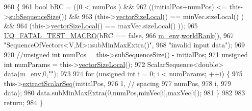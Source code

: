 \begin{DoxyCode}
960 \{
961   \textcolor{keywordtype}{bool} bRC = ((0                       <  numPos                 ) &&
962               ((initialPos+numPos)     <= this->\hyperlink{class_q_u_e_s_o_1_1_sequence_of_vectors_a0224bd3e961d86af5d2886301c0c2b86}{subSequenceSize}()) &&
963               (this->\hyperlink{class_q_u_e_s_o_1_1_base_vector_sequence_a2fefedf9e5b90f22881103b3f92555f6}{vectorSizeLocal}() == minVec.sizeLocal()     ) &&
964               (this->\hyperlink{class_q_u_e_s_o_1_1_base_vector_sequence_a2fefedf9e5b90f22881103b3f92555f6}{vectorSizeLocal}() == maxVec.sizeLocal()     ));
965   \hyperlink{_defines_8h_a56d63d18d0a6d45757de47fcc06f574d}{UQ\_FATAL\_TEST\_MACRO}(bRC == \textcolor{keyword}{false},
966                       \hyperlink{class_q_u_e_s_o_1_1_base_vector_sequence_a8e8824d2a63c5a43bcc6473e3a0491e8}{m\_env}.\hyperlink{class_q_u_e_s_o_1_1_base_environment_a78b57112bbd0e6dd0e8afec00b40ffa7}{worldRank}(),
967                       \textcolor{stringliteral}{"SequenceOfVectors<V,M>::subMinMaxExtra()"},
968                       \textcolor{stringliteral}{"invalid input data"});
969 
970   \textcolor{comment}{//unsigned int numPos = this->subSequenceSize() - initialPos;}
971   \textcolor{keywordtype}{unsigned} \textcolor{keywordtype}{int} numParams = this->\hyperlink{class_q_u_e_s_o_1_1_base_vector_sequence_a2fefedf9e5b90f22881103b3f92555f6}{vectorSizeLocal}();
972   ScalarSequence<double> data(\hyperlink{class_q_u_e_s_o_1_1_base_vector_sequence_a8e8824d2a63c5a43bcc6473e3a0491e8}{m\_env},0,\textcolor{stringliteral}{""});
973 
974   \textcolor{keywordflow}{for} (\textcolor{keywordtype}{unsigned} \textcolor{keywordtype}{int} i = 0; i < numParams; ++i) \{
975     this->\hyperlink{class_q_u_e_s_o_1_1_sequence_of_vectors_ac977b3b26a6af2ae727671f1246262fd}{extractScalarSeq}(initialPos,
976                            1, \textcolor{comment}{// spacing}
977                            numPos,
978                            i,
979                            data);
980     data.subMinMaxExtra(0,numPos,minVec[i],maxVec[i]);
981   \}
982 
983   \textcolor{keywordflow}{return};
984 \}
\end{DoxyCode}

